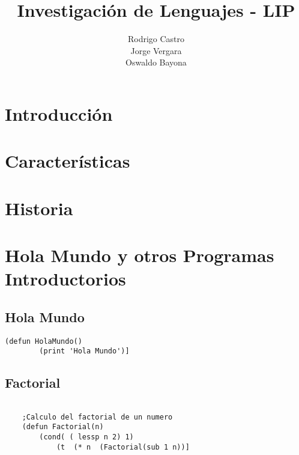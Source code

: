 \documentclass[11pt]{article} %
\title{Investigación de Lenguajes - LIP}
\author{Rodrigo Castro\\Jorge Vergara\\Oswaldo Bayona}
\begin{document}
\maketitle

\section{Introducción}



\section{Características}

\section{Historia}






\section{Hola Mundo y otros Programas Introductorios}


\subsection{Hola Mundo}
\lstset{language=LISP}          

\begin{lstlisting}[frame=single] 
	(defun HolaMundo()
		(print 'Hola Mundo')]

\end{lstlisting}

\subsection{Factorial}

\lstset{language=LISP}          %

\begin{lstlisting}[frame=single]
	
	;Calculo del factorial de un numero
	(defun Factorial(n)
		(cond( ( lessp n 2) 1)
			(t  (* n  (Factorial(sub 1 n))] 
\end{lstlisting}
\end{document}
